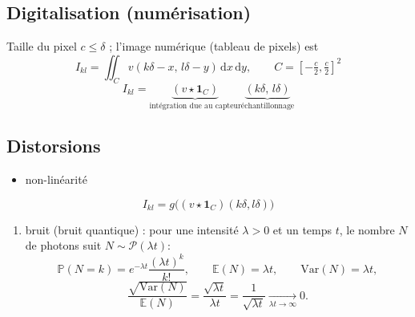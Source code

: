 \begin{figure}[!h]\centering
  
\end{figure}
 
\subsection{Digitalisation (numérisation)}
 
\begin{figure}[!h]\centering
  
\end{figure}
 
Taille du pixel $c\le\delta$ ; l'image numérique (tableau de pixels) est
\[
  I_{kl}=\iint_{C} v(k\delta-x,\,l\delta-y)\,\mathrm{d}x\,\mathrm{d}y,
  \qquad
  C=\left[-\tfrac c2,\tfrac c2\right]^{2}
\]
\[
  I_{kl}=\underbrace{(v\star\mathbf{1}_C)}_{\text{intégration due au capteur}}
  \underbrace{(k\delta,\,l\delta)}_{\text{échantillonnage}}
\]

\subsection{Distorsions}
 
\begin{itemize}
  \item non-linéarité
\end{itemize}
\[
  I_{kl}=g\big((v\star\mathbf{1}_C)(k\delta,l\delta)\big)
\]
 
\begin{figure}[!h]\centering
  
\end{figure}

 
\begin{enumerate}[label=\textcircled{\arabic*}]
  \item bruit (bruit quantique) : pour une intensité $\lambda>0$ et un temps $t$, le nombre $N$ de photons suit $N\sim\mathcal{P}(\lambda t)$:
  \[
    \mathbb{P}(N=k)=e^{-\lambda t}\frac{(\lambda t)^{k}}{k!},
    \qquad
    \mathbb{E}(N)=\lambda t,
    \qquad
    \mathrm{Var}(N)=\lambda t,
  \]
  \[
    \frac{\sqrt{\mathrm{Var}(N)}}{\mathbb{E}(N)}
    =\frac{\sqrt{\lambda t}}{\lambda t}
    =\frac{1}{\sqrt{\lambda t}}
    \xrightarrow[\lambda t\to\infty]{}0.
  \]
\end{enumerate}


